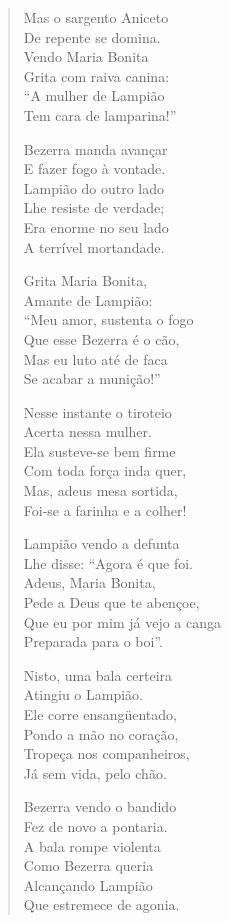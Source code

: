 \begin{verse}
Mas o sargento Aniceto\\
De repente se domina.\\
Vendo Maria Bonita\\
Grita com raiva canina:\\
“A mulher de Lampião\\
Tem cara de lamparina!”

Bezerra manda avançar\\
E fazer fogo à vontade.\\
Lampião do outro lado\\
Lhe resiste de verdade;\\
Era enorme no seu lado\\
A terrível mortandade.


Grita Maria Bonita,\\
Amante de Lampião:\\
“Meu amor, sustenta o fogo\\
Que esse Bezerra é o cão,\\
Mas eu luto até de faca\\
Se acabar a munição!”

Nesse instante o tiroteio\\
Acerta nessa mulher.\\
Ela susteve-se bem firme\\
Com toda força inda quer,\\
Mas, adeus mesa sortida,\\
Foi-se a farinha e a colher!

Lampião vendo a defunta\\
Lhe disse: “Agora é que foi.\\
Adeus, Maria Bonita,\\
Pede a Deus que te abençoe,\\
Que eu por mim já vejo a canga\\
Preparada para o boi”.

Nisto, uma bala certeira\\
Atingiu o Lampião.\\
Ele corre ensangüentado,\\
Pondo a mão no coração,\\
Tropeça nos companheiros,\\
Já sem vida, pelo chão.


Bezerra vendo o bandido\\
Fez de novo a pontaria.\\
A bala rompe violenta\\
Como Bezerra queria\\
Alcançando Lampião\\
Que estremece de agonia.


\end{verse}
